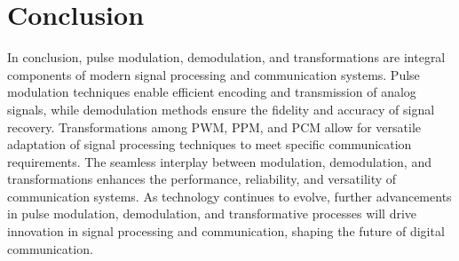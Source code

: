 \documentclass{IEEEtran}
\begin{document}
	

	
	\section{Conclusion}
		
	In conclusion, pulse modulation, demodulation, and transformations are integral components of modern signal processing and communication systems. Pulse modulation techniques enable efficient encoding and transmission of analog signals, while demodulation methods ensure the fidelity and accuracy of signal recovery. Transformations among PWM, PPM, and PCM allow for versatile adaptation of signal processing techniques to meet specific communication requirements. The seamless interplay between modulation, demodulation, and transformations enhances the performance, reliability, and versatility of communication systems. As technology continues to evolve, further advancements in pulse modulation, demodulation, and transformative processes will drive innovation in signal processing and communication, shaping the future of digital communication.	
	
\end{document}
